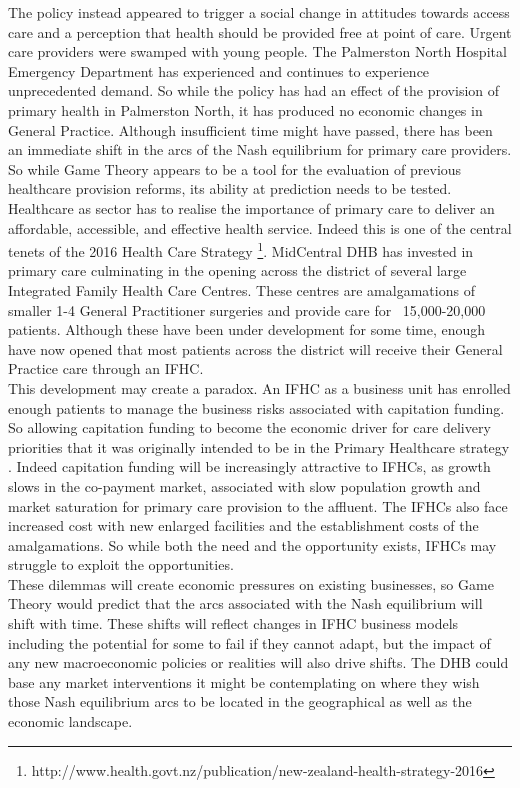 \documentclass[11pt,a4paper]{article}
\begin{document}
The policy instead appeared to trigger a social change in attitudes towards access care and a perception that health should be provided free at point of care. Urgent care providers were swamped with young people. The Palmerston North Hospital Emergency Department has experienced and continues to experience unprecedented demand. So while the policy has had an effect of the provision of primary health in Palmerston North, it has produced no economic changes in General Practice. Although insufficient time might have passed, there has been an immediate shift in the arcs of the Nash equilibrium for primary care providers.\\


So while Game Theory appears to be a tool for the evaluation of previous healthcare provision reforms, its ability at prediction needs to be tested. Healthcare as sector  has to realise the importance of primary care to deliver an affordable, accessible, and effective health service. Indeed this is one of the central tenets of the 2016 Health Care Strategy \footnote{http://www.health.govt.nz/publication/new-zealand-health-strategy-2016}. MidCentral DHB has invested in primary care culminating in the opening across the district of several large Integrated Family Health Care Centres. These centres are amalgamations of smaller 1-4 General Practitioner surgeries and provide care for ~15,000-20,000 patients. Although these have been under development for some time, enough have now opened that most patients across the district will receive their General Practice care through an IFHC.\\




This development may create a paradox. An IFHC as a business unit has enrolled enough patients to manage the business risks associated with capitation funding. So allowing capitation funding to become the economic driver for care delivery priorities that it was originally intended to be in the Primary Healthcare strategy \citep{king2001primary}. Indeed capitation funding will be increasingly attractive to IFHCs, as growth slows in the co-payment market, associated with slow population growth and market saturation for primary care provision to the affluent. The IFHCs also face increased cost with new enlarged facilities and the establishment costs of the amalgamations. So while both the need and the opportunity exists, IFHCs may struggle to exploit the opportunities.\\


These dilemmas will create economic pressures on existing businesses, so Game Theory would predict that the arcs associated with the Nash equilibrium will shift with time. These shifts will reflect changes in IFHC business models including the potential for some to fail if they cannot adapt, but the impact of any new macroeconomic policies or realities will also drive shifts. The DHB could base any market interventions it might be contemplating on where they wish those Nash equilibrium arcs to be located in the geographical as well as the economic landscape.\\
\end{document}
